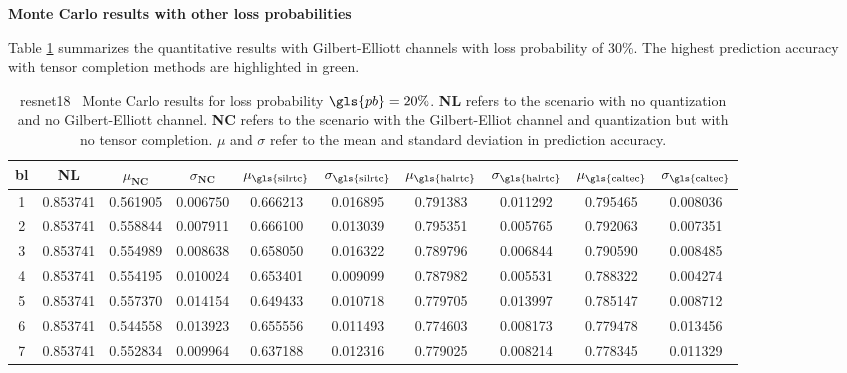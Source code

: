 \textbf{Monte Carlo results with other loss probabilities}

Table \ref{table:expts:mc:0.2} summarizes the quantitative results with Gilbert-Elliott channels with loss probability of 30\%. The highest prediction accuracy with tensor completion methods are highlighted in green.

\begin{table}[H]
	\caption[ResNet18 Monte Carlo results with 20 \% loss probability]{\gls{resnet18} \addone~Monte Carlo results for loss probability $\gls{pb} = 20\%$. \textbf{NL} refers to the scenario with no quantization and no Gilbert-Elliott channel. \textbf{NC} refers to the scenario with the Gilbert-Elliot channel and quantization but with no tensor completion. $\mu$ and $\sigma$ refer to the mean and standard deviation in prediction accuracy.} \label{table:expts:mc:0.2}
	\centering
	\begin{adjustbox}{max width = \textwidth}
		\begin{tabular}{|c|c|cc|cc|cc|cc|}
			\hline
			\gls{bl} &  \textbf{NL} &  $\mu_{\textbf{NC}}$ &  $\sigma_{\textbf{NC}}$ &  $\mu_{\text{\gls{silrtc}}}$ &  $\sigma_{\text{\gls{silrtc}}}$ &  $\mu_{\text{\gls{halrtc}}}$ &  $\sigma_{\text{\gls{halrtc}}}$ &  $\mu_{\text{\gls{caltec}}}$ &  $\sigma_{\text{\gls{caltec}}}$ \\
			\hline \hline 
		1 &   0.853741 &             0.561905 &            0.006750 &     0.666213 &    0.016895 &     0.791383 &    0.011292 &   \cellcolor{green!25}  0.795465 &    0.008036 \\
		2 &   0.853741 &             0.558844 &            0.007911 &     0.666100 &    0.013039 &   \cellcolor{green!25}  0.795351 &    0.005765 &     0.792063 &    0.007351 \\
		3 &   0.853741 &             0.554989 &            0.008638 &     0.658050 &    0.016322 &     0.789796 &    0.006844 &  \cellcolor{green!25}   0.790590 &    0.008485 \\
		4 &   0.853741 &             0.554195 &            0.010024 &     0.653401 &    0.009099 &     0.787982 &    0.005531 &   \cellcolor{green!25}  0.788322 &    0.004274 \\
		5 &   0.853741 &             0.557370 &            0.014154 &     0.649433 &    0.010718 &     0.779705 &    0.013997 &  \cellcolor{green!25}    0.785147 &    0.008712 \\
		6 &   0.853741 &             0.544558 &            0.013923 &     0.655556 &    0.011493 &     0.774603 &    0.008173 &   \cellcolor{green!25}  0.779478 &    0.013456 \\
		7 &   0.853741 &             0.552834 &            0.009964 &     0.637188 &    0.012316 &    \cellcolor{green!25} 0.779025 &    0.008214 &     0.778345 &    0.011329 \\
			\hline 
		\end{tabular}
	\end{adjustbox}
\end{table}

